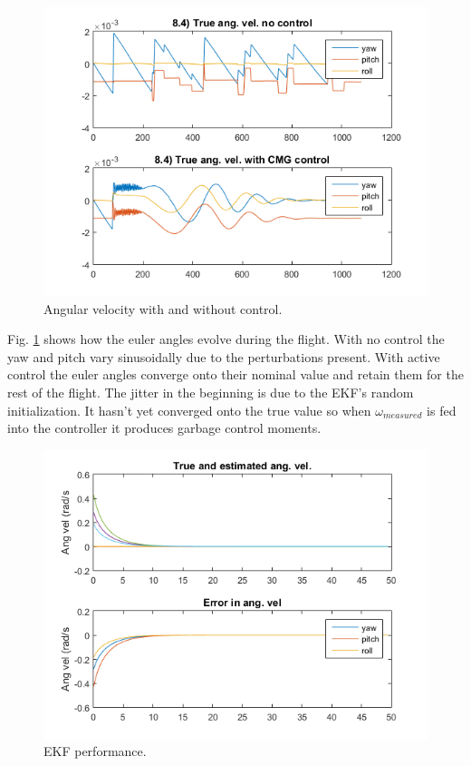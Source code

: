 \documentclass[12pt, letterpaper]{article}
\begin{document}
\begin{figure}[H]
	\centering
	\includegraphics[scale=0.9]{ps8_01}
	\caption{Angular velocity with and without control.}
	\label{8:angvel}
\end{figure}

Fig. \ref{8:angvel} shows how the euler angles evolve during the flight. With no control the yaw and pitch vary sinusoidally due to the perturbations present. With active control the euler angles converge onto their nominal value and retain them for the rest of the flight. The jitter in the beginning is due to the EKF's random initialization. It hasn't yet converged onto the true value so when $\omega_{measured}$ is fed into the controller it produces garbage control moments.

\begin{figure}[H]
	\centering
	\includegraphics[scale=0.9]{ps8_02}
	\caption{EKF performance.}
	\label{8:ekf}
\end{figure}
\end{document}
